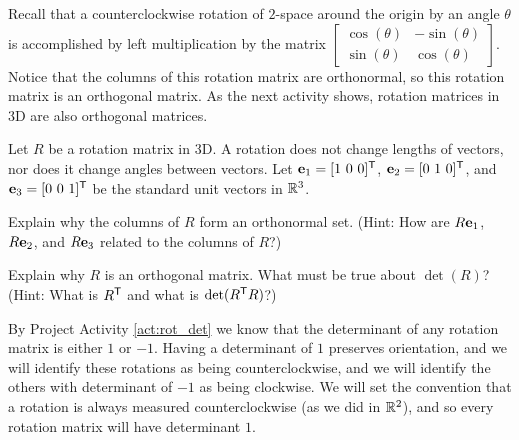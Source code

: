 \ee

\label{sec:proj_3d_rotate}

Recall that a counterclockwise rotation of $2$-space around the origin by an angle $\theta$ is accomplished by left multiplication by the matrix $\left[ \begin{array}{cr} \cos(\theta)&-\sin(\theta) \\ \sin(\theta)&\cos(\theta) \end{array} \right]$. Notice that the columns of this rotation matrix are orthonormal, so this rotation matrix is an orthogonal matrix. As the next activity shows, rotation matrices in 3D are also orthogonal matrices.

\begin{pactivity} \label{act:rot_det} Let $R$ be a rotation matrix in 3D.  A rotation does not change lengths of vectors, nor does it change angles between vectors. Let $\mathbf{e}_1 = [ 1 \ 0 \ 0]^{\mathsf{T}}$, $\mathbf{e}_2 = [0 \ 1 \ 0]^{\mathsf{T}}$, and $\mathbf{e}_3 = [0 \ 0 \ 1]^{\mathsf{T}}$ be the standard unit vectors in $\mathbb{R}^3$.
\ba
\item Explain why the columns of $R$ form an orthonormal set. (Hint: How are $R \mathbf{e}_1$, $R\mathbf{e}_2$, and $R\mathbf{e}_3$ related to the columns of $R$?) 

\item Explain why $R$ is an orthogonal matrix. What must be true about $\det(R)$? (Hint: What is $R^{\mathsf{T}}$ and what is $\det(R^{\mathsf{T}}R)$?)

\ea

\end{pactivity}

By Project Activity \ref{act:rot_det} we know that the determinant of any rotation matrix is either $1$ or $-1$. Having a determinant of $1$ preserves orientation, and we will identify these rotations as being counterclockwise, and we will identify the others with determinant of $-1$ as being clockwise. We will set the convention that a rotation is always measured counterclockwise (as we did in $\mathbb{R}^2$), and so every rotation matrix will have determinant $1$. 


